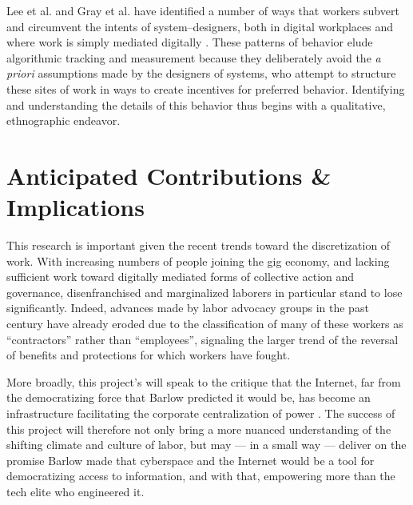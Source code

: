 \documentclass{article}
\begin{document}
Lee et al. and Gray et al. have identified a number of ways that workers subvert and circumvent the intents of system--designers,
both in digital workplaces and where work is simply mediated digitally
\citep{uberAlgorithm,crowdcollab}.
These patterns of behavior elude algorithmic tracking and measurement because they deliberately avoid the \textit{a priori} assumptions made by the designers of systems,
who attempt to structure these sites of work in ways to create incentives for preferred behavior.
Identifying and understanding the details of this behavior thus begins with a qualitative,
ethnographic endeavor.

\section*{Anticipated Contributions \& Implications}
This research is important given the recent trends toward the discretization of work.
With increasing numbers of people joining the gig economy,
and lacking sufficient work toward digitally mediated forms of collective action and governance,
disenfranchised and marginalized laborers in particular stand to lose significantly.
Indeed, advances made by labor advocacy groups in the past century have already eroded
due to the classification of many of these workers as ``contractors'' rather than ``employees'',
signaling the larger trend of the reversal of benefits and protections for which workers have fought.

More broadly, this project's will speak to the critique that the Internet,
far from the democratizing force that Barlow predicted it would be,
has become an infrastructure facilitating the corporate centralization of power
\citep{barlow2009declaration,jones2011does,EboCybertopia}.
The success of this project will therefore not only
bring a more nuanced understanding of the shifting climate and culture of labor,
but may
--- in a small way ---
deliver on the promise Barlow made that
cyberspace and the Internet would be a tool for democratizing access to information, and with that,
empowering more than the tech elite who engineered it.


\pagebreak

% 

\end{document}
